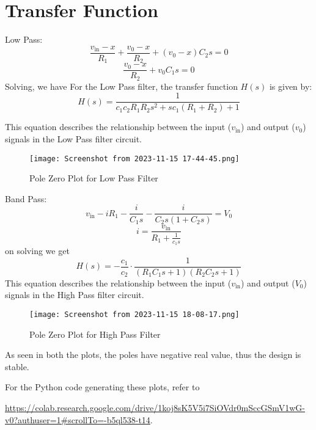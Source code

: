 \documentclass{article}
\begin{document}
\maketitle
\newpage
\section{Transfer Function}
Low Pass:
\[
\frac{{v_{\text{in}} - x}}{{R_1}} + \frac{{v_0 - x}}{{R_2}} + (v_0 - x)C_2s = 0
\]
\[
\frac{{v_0 - x}}{{R_2}} + v_0C_1s = 0
\]
Solving, we have
For the Low Pass filter, the transfer function \( H(s) \) is given by:
\[ H(s) = \frac{1}{{c_1 c_2 R_1 R_2 s^2 + s c_1 (R_1 + R_2) + 1}} \]

This equation describes the relationship between the input (\( v_{\text{in}} \)) and output (\( v_0 \)) signals in the Low Pass filter circuit.

\begin{figure}[ht]
  \centering
  \texttt{[image: Screenshot from 2023-11-15 17-44-45.png]} %
  \caption{Pole Zero Plot for Low Pass Filter}
  \label{fig:your_image}
\end{figure}
\newpage
Band Pass:
\[
v_{\text{in}} - iR_1 - \frac{i}{C_1s} - \frac{i}{C_2s(1 + C_2s)} = V_0
\]
\[
i = \frac{v_{\text{in}}}{R_1+ \frac{1}{c_1s}} 
\]
on solving we get 
\[
H(s) = -\frac{c_1}{c_2} \cdot \frac{1}{(R_1C_1s + 1)(R_2C_2s + 1)}
\]
This equation describes the relationship between the input (\( v_{\text{in}} \)) and output (\( V_0 \)) signals in the High Pass filter circuit.

\begin{figure}[ht]
  \centering
  \texttt{[image: Screenshot from 2023-11-15 18-08-17.png]} %
  \caption{Pole Zero Plot for High Pass Filter}
  \label{fig:your_image_high_pass}
\end{figure}

As seen in both the plots, the poles have negative real value, thus the design is stable. 


For the Python code generating these plots, refer to 

\url{https://colab.research.google.com/drive/1koj8sK5V5i7SiOVdr0mSccGSmV1wG-v0?authuser=1#scrollTo=-b5ql538-t14}.
\end{document}
